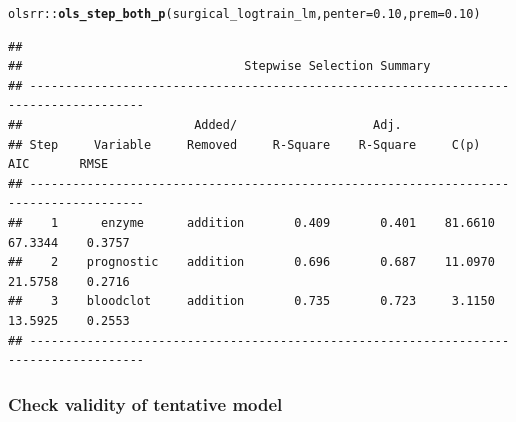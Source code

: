 \documentclass{article}\usepackage[]{graphicx}\usepackage[]{color}
\makeatletter
\newcommand{\hlnum}[1]{\textcolor[rgb]{0.686,0.059,0.569}{#1}}%
\newcommand{\hlopt}[1]{\textcolor[rgb]{0,0,0}{#1}}%
\newcommand{\hlstd}[1]{\textcolor[rgb]{0.345,0.345,0.345}{#1}}%
\newcommand{\hlkwc}[1]{\textcolor[rgb]{0.333,0.667,0.333}{#1}}%
\newcommand{\hlkwd}[1]{\textcolor[rgb]{0.737,0.353,0.396}{\textbf{#1}}}%
\newenvironment{kframe}{%
 \def\at@end@of@kframe{}%
 \ifinner\ifhmode%
  \def\at@end@of@kframe{\end{minipage}}%
  \begin{minipage}{\columnwidth}%
 \fi\fi%
 \def\FrameCommand##1{\hskip\@totalleftmargin \hskip-\fboxsep
 \colorbox{shadecolor}{##1}\hskip-\fboxsep
     \hskip-\linewidth \hskip-\@totalleftmargin \hskip\columnwidth}%
 \MakeFramed {\advance\hsize-\width
   \@totalleftmargin\z@ \linewidth\hsize
   \@setminipage}}%
 {\par\unskip\endMakeFramed%
 \at@end@of@kframe}
\newenvironment{knitrout}{}{} %
\makeatother
\begin{document}
\begin{knitrout}
\color{fgcolor}\begin{kframe}
\begin{alltt}
\hlstd{olsrr}\hlopt{::}\hlkwd{ols_step_both_p}\hlstd{(surgical_logtrain_lm,} \hlkwc{penter} \hlstd{=} \hlnum{0.10}\hlstd{,} \hlkwc{prem} \hlstd{=} \hlnum{0.10}\hlstd{)}
\end{alltt}
\begin{verbatim}
## 
##                               Stepwise Selection Summary                               
## --------------------------------------------------------------------------------------
##                        Added/                   Adj.                                      
## Step     Variable     Removed     R-Square    R-Square     C(p)        AIC       RMSE     
## --------------------------------------------------------------------------------------
##    1      enzyme      addition       0.409       0.401    81.6610    67.3344    0.3757    
##    2    prognostic    addition       0.696       0.687    11.0970    21.5758    0.2716    
##    3    bloodclot     addition       0.735       0.723     3.1150    13.5925    0.2553    
## --------------------------------------------------------------------------------------
\end{verbatim}
\end{kframe}
\end{knitrout}

\subsubsection*{Check validity of tentative model}
\end{document}
